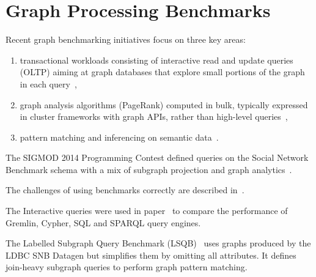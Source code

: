 
\section{Graph Processing Benchmarks}

Recent graph benchmarking initiatives focus on three key areas:

\begin{enumerate}
\item transactional workloads consisting of interactive read and update queries (OLTP) aiming at graph databases that explore small portions of the graph in each query~\cite{DBLP:conf/cidr/BarahmandG13,DBLP:conf/sigmod/ArmstrongPBC13,DBLP:journals/ase/DayarathnaS14,DBLP:conf/sigmod/ErlingALCGPPB15,DBLP:journals/pvldb/LissandriniBV18},
\item graph analysis algorithms (\eg PageRank) computed in bulk, typically expressed in cluster frameworks with graph APIs, rather than high-level queries~\cite{DBLP:conf/hipc/BaderM05,DBLP:conf/bigdataconf/ElserM13,DBLP:conf/sc/NaiXTKL15,DBLP:journals/pvldb/IosupHNHPMCCSAT16},
\item pattern matching and inferencing on semantic data~\cite{DBLP:journals/ws/GuoPH05,DBLP:books/sp/virgilio09/SchmidtHMPL09,DBLP:conf/semweb/MorseyLAN11,DBLP:conf/semweb/AlucHOD14,DBLP:journals/sosym/SzarnyasIRV18}.
\end{enumerate}

The SIGMOD 2014 Programming Contest defined queries on the Social Network Benchmark schema with a mix of subgraph projection and graph analytics~\cite{DBLP:journals/corr/abs-2010-12243}.

The challenges of using benchmarks correctly are described in~\cite{DBLP:conf/sigmod/RaasveldtHGM18}.

The Interactive queries were used in paper~\cite{DBLP:conf/grades/PacaciZLO17} to compare the performance of Gremlin, Cypher, SQL and SPARQL query engines.

The Labelled Subgraph Query Benchmark (LSQB)~\cite{DBLP:conf/sigmod/MhedhbiLKWS21} uses graphs produced by the LDBC SNB Datagen but simplifies them by omitting all attributes. It defines join-heavy subgraph queries to perform graph pattern matching.


